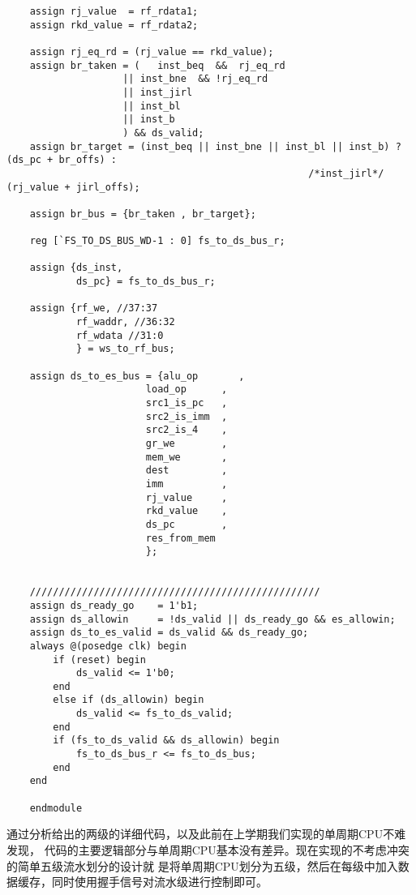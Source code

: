 \begin{lstlisting}
    assign rj_value  = rf_rdata1;
    assign rkd_value = rf_rdata2;

    assign rj_eq_rd = (rj_value == rkd_value);
    assign br_taken = (   inst_beq  &&  rj_eq_rd
                    || inst_bne  && !rj_eq_rd
                    || inst_jirl
                    || inst_bl
                    || inst_b
                    ) && ds_valid;
    assign br_target = (inst_beq || inst_bne || inst_bl || inst_b) ? (ds_pc + br_offs) :
                                                    /*inst_jirl*/ (rj_value + jirl_offs);
                                                    
    assign br_bus = {br_taken , br_target};

    reg [`FS_TO_DS_BUS_WD-1 : 0] fs_to_ds_bus_r;

    assign {ds_inst,
            ds_pc} = fs_to_ds_bus_r;

    assign {rf_we, //37:37
            rf_waddr, //36:32
            rf_wdata //31:0
            } = ws_to_rf_bus;     
    
    assign ds_to_es_bus = {alu_op       ,  
                        load_op      ,  
                        src1_is_pc   ,   
                        src2_is_imm  ,  
                        src2_is_4    ,  
                        gr_we        , 
                        mem_we       ,   
                        dest         ,   
                        imm          ,  
                        rj_value     ,   
                        rkd_value    ,   
                        ds_pc        ,    
                        res_from_mem
                        };


    //////////////////////////////////////////////////
    assign ds_ready_go    = 1'b1;
    assign ds_allowin     = !ds_valid || ds_ready_go && es_allowin;
    assign ds_to_es_valid = ds_valid && ds_ready_go;
    always @(posedge clk) begin
        if (reset) begin
            ds_valid <= 1'b0;
        end
        else if (ds_allowin) begin
            ds_valid <= fs_to_ds_valid;
        end
        if (fs_to_ds_valid && ds_allowin) begin
            fs_to_ds_bus_r <= fs_to_ds_bus;
        end
    end
                                
    endmodule
\end{lstlisting}

通过分析给出的两级的详细代码，以及此前在上学期我们实现的单周期CPU不难发现，
代码的主要逻辑部分与单周期CPU基本没有差异。现在实现的不考虑冲突的简单五级流水划分的设计就
是将单周期CPU划分为五级，然后在每级中加入数据缓存，同时使用握手信号对流水级进行控制即可。

